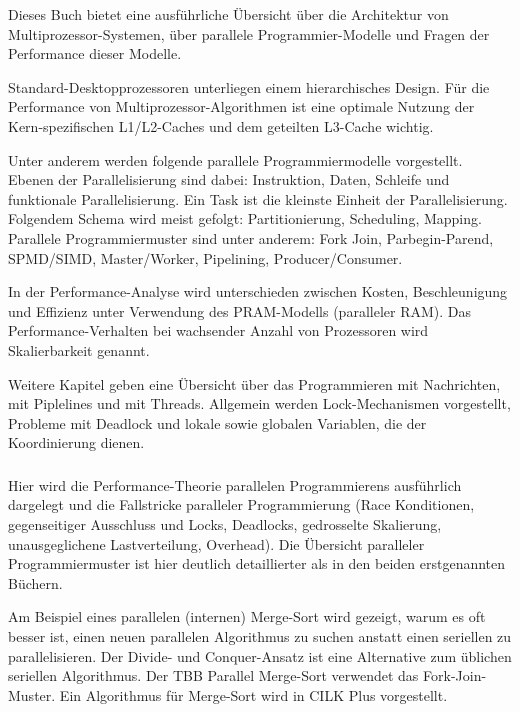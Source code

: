 \documentclass[a4paper,12pt,twoside]{article}
\begin{document}
Dieses Buch bietet eine ausführliche Übersicht über die Architektur von Multiprozessor-Systemen, über parallele Programmier-Modelle und Fragen der Performance dieser Modelle.

Standard-Desktopprozessoren unterliegen einem hierarchisches Design. Für die Performance von Multiprozessor-Algorithmen ist eine optimale Nutzung der Kern-spezifischen L1/L2-Caches und dem geteilten L3-Cache wichtig. 

Unter anderem werden folgende parallele Programmiermodelle vorgestellt. Ebenen der Parallelisierung sind dabei: Instruktion, Daten, Schleife und funktionale Parallelisierung. Ein Task ist die kleinste Einheit der Parallelisierung. Folgendem Schema wird meist gefolgt: Partitionierung, Scheduling, Mapping. Parallele Programmiermuster sind unter anderem: Fork Join, Parbegin-Parend, SPMD/SIMD, Master/Worker, Pipelining, Producer/Consumer.

In der Performance-Analyse wird unterschieden zwischen Kosten, Beschleunigung und Effizienz unter Verwendung des PRAM-Modells (paralleler RAM). Das Performance-Verhalten bei wachsender Anzahl von Prozessoren wird Skalierbarkeit genannt.

Weitere Kapitel geben eine Übersicht über das Programmieren mit Nachrichten, mit Piplelines und mit Threads. Allgemein werden Lock-Mechanismen vorgestellt, Probleme mit Deadlock und lokale sowie globalen Variablen, die der Koordinierung dienen.

\subsubsection*{}

Hier wird die Performance-Theorie parallelen Programmierens ausführlich dargelegt und die Fallstricke paralleler Programmierung (Race Konditionen, gegenseitiger Ausschluss und Locks, Deadlocks, gedrosselte Skalierung, unausgeglichene Lastverteilung, Overhead). Die Übersicht paralleler Programmiermuster ist hier deutlich detaillierter als in den beiden erstgenannten Büchern.

Am Beispiel eines parallelen (internen) Merge-Sort wird gezeigt, warum es oft besser ist, einen neuen parallelen Algorithmus zu suchen anstatt einen seriellen zu parallelisieren. Der Divide- und Conquer-Ansatz ist eine Alternative zum üblichen seriellen Algorithmus. Der TBB Parallel Merge-Sort verwendet das Fork-Join-Muster. Ein Algorithmus für Merge-Sort wird in CILK Plus vorgestellt. 
\end{document}
